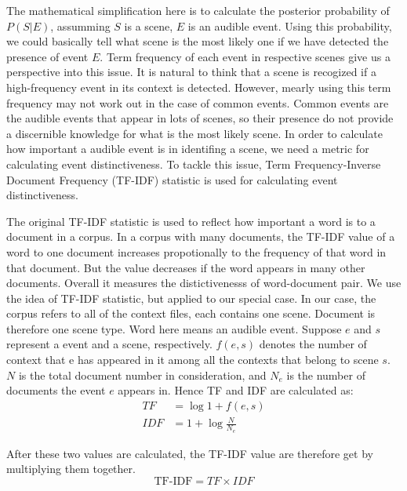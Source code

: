 The mathematical simplification here is to calculate the posterior probability of $P(S|E)$, assumming $S$ is a scene, $E$ is an audible event. 
Using this probability, we could basically tell what scene is the most likely one if we have detected the presence of event $E$. 
Term frequency of each event in respective scenes give us a perspective into this issue. 
It is natural to think that a scene is recogized if a high-frequency event in its context is detected. 
However, mearly using this term frequency may not work out in the case of common events. 
Common events are the audible events that appear in lots of scenes, so their presence do not provide a discernible knowledge for what is the most likely scene. 
In order to calculate how important a audible event is in identifing a scene, we need a metric for calculating event distinctiveness. 
To tackle this issue, Term Frequency-Inverse Document Frequency (TF-IDF) statistic is used for calculating event distinctiveness. 

The original TF-IDF statistic is used to reflect how important a word is to a document in a corpus. 
In a corpus with many documents, the TF-IDF value of a word to one document increases propotionally to the frequency of that word in that document. 
But the value decreases if the word appears in many other documents. 
Overall it measures the distictivenesss of word-document pair. 
We use the idea of TF-IDF statistic, but applied to our special case. 
In our case, the corpus refers to all of the context files, each contains one scene. 
Document is therefore one scene type. 
Word here means an audible event. 
Suppose $e$ and $s$ represent a event and a scene, respectively. 
$f(e,s)$ denotes the number of context that e has appeared in it among all the contexts that belong to scene $s$.  
$N$ is the total document number in consideration, and $N_e$ is the number of documents the event $e$ appears in. 
Hence TF and IDF are calculated as: 
\begin{equation}
\begin{split}
 TF &= \log{1+f(e,s)} \\ 
 IDF &= 1 + \log{\frac{N}{N_e}}
\end{split}
\end{equation} 

After these two values are calculated, the TF-IDF value are therefore get by multiplying them together. 
\begin{equation}
 \text{TF-IDF} = TF \times IDF 
\end{equation}

